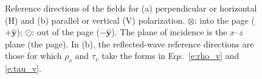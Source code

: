 \documentclass[11pt, oneside]{article}
\begin{document}
\begin{figure}[h]
	\caption{Reference directions of the fields for (a) perpendicular or horizontal (H) and (b) parallel or vertical (V) polarization. $\otimes$: into the page ($+\hat{\mathbf{y}}$); $\odot$: out of the page ($-\hat{\mathbf{y}}$). The plane of incidence is the $x$--$z$ plane (the page). In (b), the reflected-wave reference directions are those for which $\rho_v$ and $\tau_v$ take the forms in Eqs.~\eqref{e:rho_v} and \eqref{e:tau_v}.}
	\label{f:pol}
\end{figure}
\end{document}
